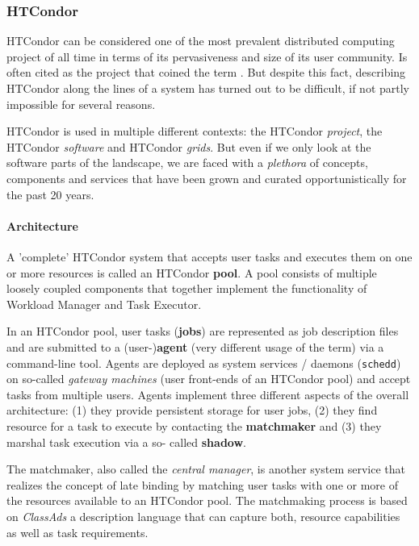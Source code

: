 \documentclass{sig-alternate}
\begin{document}
%
\subsubsection{HTCondor}

HTCondor can be considered one of the most prevalent distributed computing
project of all time in terms of its pervasiveness and size of its  user
community. Is often cited as the project that coined the term \pilotjob. But
despite this fact, describing HTCondor along the lines of a \pilotjob system has
turned out to be difficult, if not partly impossible for several reasons.

HTCondor is used in multiple different contexts: the HTCondor \textit{project},
the HTCondor \textit{software} and HTCondor \textit{grids}. But even if we only
look at the software parts of the landscape, we are faced with a
\textit{plethora} of concepts, components and services that have been grown and
curated opportunistically for the past 20 years.

\paragraph{Architecture}


A 'complete' HTCondor system that accepts user tasks and executes them on one or
more resources is called an HTCondor \textbf{pool}. A pool consists of multiple
loosely coupled components that together implement the functionality of Workload
Manager and Task Executor.

In an HTCondor pool, user tasks (\textbf{jobs}) are represented as job
description files and are submitted to a (user-)\textbf{agent} (very different
usage of the term) via a command-line tool. Agents are deployed as system
services / daemons (\texttt{schedd}) on so-called \textit{gateway machines}
(user front-ends of an HTCondor pool) and accept tasks from multiple users.
Agents implement three different aspects of the overall architecture: (1) they
provide persistent storage for user jobs, (2) they find resource for a task to
execute by contacting the \textbf{matchmaker} and (3) they marshal task
execution via a so- called \textbf{shadow}.

The matchmaker, also called the \textit{central manager}, is another system 
service that realizes the concept of late binding by matching user tasks 
with one or more of the resources available to an HTCondor pool. The 
matchmaking process is based on \textit{ClassAds} a description language that 
can capture both, resource capabilities as well as task requirements. 
\end{document}
